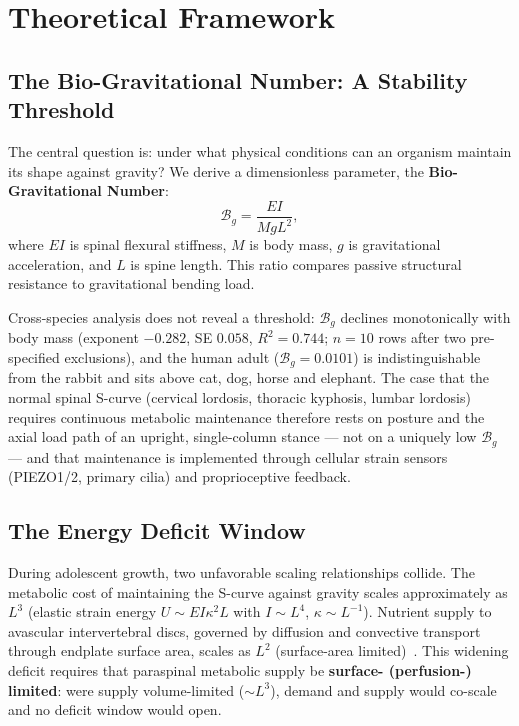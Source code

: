 \section{Theoretical Framework}

\subsection{The Bio-Gravitational Number: A Stability Threshold}

The central question is: under what physical conditions can an organism maintain its shape against gravity? We derive a dimensionless parameter, the \textbf{Bio-Gravitational Number}:
\begin{equation}
\mathcal{B}_g = \frac{EI}{M g L^2},
\label{eq:bg_number}
\end{equation}
where $EI$ is spinal flexural stiffness, $M$ is body mass, $g$ is gravitational acceleration, and $L$ is spine length. This ratio compares passive structural resistance to gravitational bending load.

Cross-species analysis does not reveal a threshold: $\mathcal{B}_g$ declines monotonically with body mass (exponent $-0.282$, SE $0.058$, $R^2 = 0.744$; $n = 10$ rows after two pre-specified exclusions), and the human adult ($\mathcal{B}_g = 0.0101$) is indistinguishable from the rabbit and sits above cat, dog, horse and elephant. The case that the normal spinal S-curve (cervical lordosis, thoracic kyphosis, lumbar lordosis) requires continuous metabolic maintenance therefore rests on posture and the axial load path of an upright, single-column stance --- not on a uniquely low $\mathcal{B}_g$ --- and that maintenance is implemented through cellular strain sensors (PIEZO1/2, primary cilia) and proprioceptive feedback.

\subsection{The Energy Deficit Window}

During adolescent growth, two unfavorable scaling relationships collide. The metabolic cost of maintaining the S-curve against gravity scales approximately as $L^3$ (elastic strain energy $U \sim EI\kappa^2 L$ with $I \sim L^4$, $\kappa \sim L^{-1}$). Nutrient supply to avascular intervertebral discs, governed by diffusion and convective transport through endplate surface area, scales as $L^{2}$ (surface-area limited)~\cite{urban2004nutrition}. This widening deficit requires that paraspinal metabolic supply be \textbf{surface- (perfusion-) limited}: were supply volume-limited ($\sim L^3$), demand and supply would co-scale and no deficit window would open.


